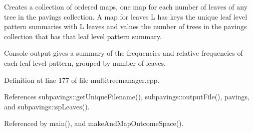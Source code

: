\-Creates a collection of ordered maps, one map for each number of leaves of any tree in the pavings collection. \-A map for leaves \-L has keys the unique leaf level pattern summaries with \-L leaves and values the number of trees in the pavings collection that has that leaf level pattern summary.

\-Console output gives a summary of the frequencies and relative frequencies of each leaf level pattern, grouped by number of leaves. 

\-Definition at line 177 of file multitreemanager.\-cpp.



\-References subpavings\-::get\-Unique\-Filename(), subpavings\-::output\-File(), pavings, and subpavings\-::sp\-Leaves().



\-Referenced by main(), and make\-And\-Map\-Outcome\-Space().


